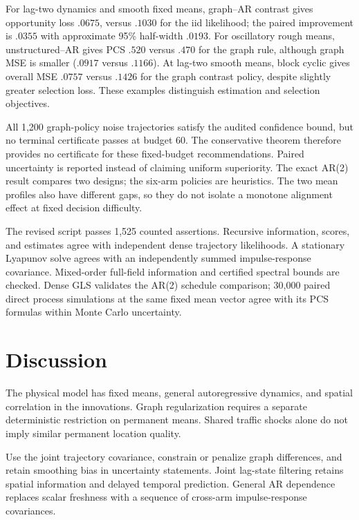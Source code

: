 \documentclass[11pt]{article}
\begin{document}
For lag-two dynamics and smooth fixed means, graph--AR contrast gives opportunity loss $.0675$, versus $.1030$ for the iid likelihood; the paired improvement is $.0355$ with approximate 95\% half-width $.0193$. For oscillatory rough means, unstructured--AR gives PCS $.520$ versus $.470$ for the graph rule, although graph MSE is smaller ($.0917$ versus $.1166$). At lag-two smooth means, block cyclic gives overall MSE $.0757$ versus $.1426$ for the graph contrast policy, despite slightly greater selection loss. These examples distinguish estimation and selection objectives.

All 1,200 graph-policy noise trajectories satisfy the audited confidence bound, but no terminal certificate passes at budget 60. The conservative theorem therefore provides no certificate for these fixed-budget recommendations. Paired uncertainty is reported instead of claiming uniform superiority. The exact AR(2) result compares two designs; the six-arm policies are heuristics. The two mean profiles also have different gaps, so they do not isolate a monotone alignment effect at fixed decision difficulty.

The revised script passes 1,525 counted assertions. Recursive information, scores, and estimates agree with independent dense trajectory likelihoods. A stationary Lyapunov solve agrees with an independently summed impulse-response covariance. Mixed-order full-field information and certified spectral bounds are checked. Dense GLS validates the AR(2) schedule comparison; 30,000 paired direct process simulations at the same fixed mean vector agree with its PCS formulas within Monte Carlo uncertainty.



\section{Discussion}
The physical model has fixed means, general autoregressive dynamics, and spatial correlation in the innovations. Graph regularization requires a separate deterministic restriction on permanent means. Shared traffic shocks alone do not imply similar permanent location quality.

Use the joint trajectory covariance, constrain or penalize graph differences, and retain smoothing bias in uncertainty statements. Joint lag-state filtering retains spatial information and delayed temporal prediction. General AR dependence replaces scalar freshness with a sequence of cross-arm impulse-response covariances.
\end{document}

